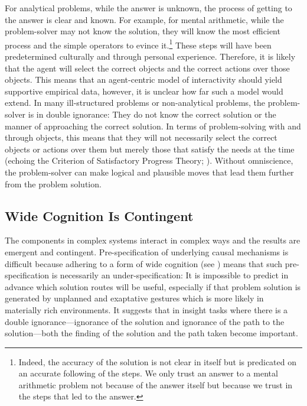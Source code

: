 {{For analytical problems, while the answer is unknown, the process of getting to the answer is clear and known. For example, for mental arithmetic, while the problem-solver may not know the solution, they will know the most efficient process and the simple operators to evince it.\footnote{Indeed, the accuracy of the solution is not clear in itself but is predicated on an accurate following of the steps. We only trust an answer to a mental arithmetic problem not because of the answer itself but because we trust in the steps that led to the answer.} These steps will have been predetermined culturally and through personal experience. Therefore, it is likely that the agent will select the correct objects and the correct actions over those objects. This means that an agent-centric model of interactivity should yield supportive empirical data, however, it is unclear how far such a model would extend. In many ill-structured problems or non-analytical problems, the problem-solver is in double ignorance: They do not know the correct solution or the manner of approaching the correct solution. In terms of problem-solving with and through objects, this means that they will not necessarily select the correct objects or actions over them but merely those that satisfy the needs at the time (echoing the Criterion of Satisfactory Progress Theory; ). Without omniscience, the problem-solver can make logical and plausible moves that lead them further from the problem solution.


\subsection{Wide Cognition Is Contingent}

The components in complex systems interact in complex ways and the results are emergent and contingent. Pre-specification of underlying causal mechanisms is difficult because adhering to a form of wide cognition (see ) means that such pre-specification is necessarily an under-specification: It is impossible to predict in advance which solution routes will be useful, especially if that problem solution is generated by unplanned and exaptative gestures which is more likely in materially rich environments. It suggests that in insight tasks where there is a double ignorance---ignorance of the solution and ignorance of the path to the solution---both the finding of the solution and the path taken become important.

}}
